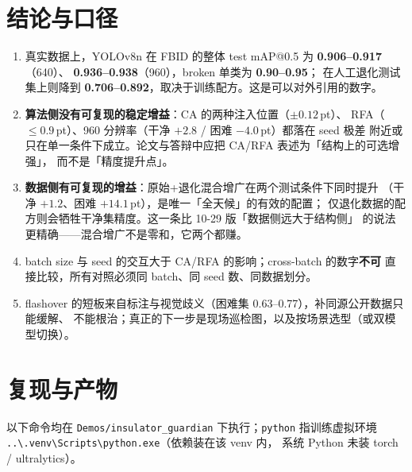 \documentclass[UTF8,a4paper,11pt]{ctexart}
\begin{document}
\section{结论与口径}

\begin{enumerate}[label=(\arabic*)]
  \item 真实数据上，YOLOv8n 在 FBID 的整体 test mAP@0.5 为 \textbf{0.906--0.917}（640）、
        \textbf{0.936--0.938}（960），broken 单类为 \textbf{0.90--0.95}；
        在人工退化测试集上则降到 \textbf{0.706--0.892}，取决于训练配方。这是可以对外引用的数字。
  \item \textbf{算法侧没有可复现的稳定增益}：CA 的两种注入位置（$\pm0.12$\,pt）、
        RFA（$\le0.9$\,pt）、960 分辨率（干净 $+2.8$ / 困难 $-4.0$\,pt）都落在 seed 极差
        附近或只在单一条件下成立。论文与答辩中应把 CA/RFA 表述为「结构上的可选增强」，
        而不是「精度提升点」。
  \item \textbf{数据侧有可复现的增益}：原始+退化混合增广在两个测试条件下同时提升
        （干净 $+1.2$、困难 $+14.1$\,pt），是唯一「全天候」的有效的配置；
        仅退化数据的配方则会牺牲干净集精度。这一条比 10-29 版「数据侧远大于结构侧」
        的说法更精确——混合增广不是零和，它两个都赚。
  \item batch size 与 seed 的交互大于 CA/RFA 的影响；cross-batch 的数字\textbf{不可}
        直接比较，所有对照必须同 batch、同 seed 数、同数据划分。
  \item flashover 的短板来自标注与视觉歧义（困难集 0.63--0.77），补同源公开数据只能缓解、
        不能根治；真正的下一步是现场巡检图，以及按场景选型（或双模型切换）。
\end{enumerate}

\section{复现与产物}

\noindent 以下命令均在 \texttt{Demos/insulator\_guardian} 下执行；\texttt{python} 指训练虚拟环境
\texttt{..\textbackslash.venv\textbackslash Scripts\textbackslash python.exe}（依赖装在该 venv 内，
系统 Python 未装 torch / ultralytics）。
\end{document}
